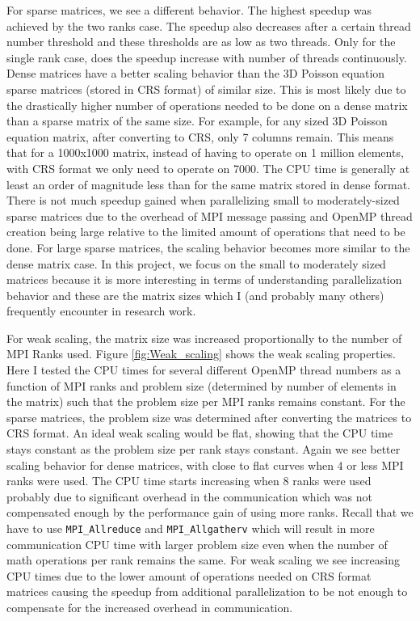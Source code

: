 \documentclass{article}
\begin{document}
For sparse matrices, we see a different behavior. The highest speedup was achieved by the two ranks case. The speedup also decreases after a certain thread number threshold and these thresholds are as low as two threads. Only for the single rank case, does the speedup increase with number of threads continuously. Dense matrices have a better scaling behavior than the 3D Poisson equation sparse matrices (stored in CRS format) of similar size. This is most likely due to the drastically higher number of operations needed to be done on a dense matrix than a sparse matrix of the same size. For example, for any sized 3D Poisson equation matrix, after converting to CRS, only 7 columns remain. This means that for a 1000x1000 matrix, instead of having to operate on 1 million elements, with CRS format we only need to operate on 7000. The CPU time is generally at least an order of magnitude less than for the same matrix stored in dense format. There is not much speedup gained when parallelizing small to moderately-sized sparse matrices due to the overhead of MPI message passing and OpenMP thread creation being large relative to the limited amount of operations that need to be done. For large sparse matrices, the scaling behavior becomes more similar to the dense matrix case. In this project, we focus on the small to moderately sized matrices because it is more interesting in terms of understanding parallelization behavior and these are the matrix sizes which I (and probably many others) frequently encounter in research work.

For weak scaling, the matrix size was increased proportionally to the number of MPI Ranks used. Figure \ref{fig:Weak_scaling} shows the weak scaling properties. Here I tested the CPU times for several different OpenMP thread numbers as a function of MPI ranks and problem size (determined by number of elements in the matrix) such that the problem size per MPI ranks remains constant. For the sparse matrices, the problem size was determined after converting the matrices to CRS format. An ideal weak scaling would be flat, showing that the CPU time stays constant as the problem size per rank stays constant. Again we see better scaling behavior for dense matrices, with close to flat curves when 4 or less MPI ranks were used. The CPU time starts increasing when 8 ranks were used probably due to significant overhead in the communication which was not compensated enough by the performance gain of using more ranks. Recall that we have to use \texttt{MPI\_Allreduce} and \texttt{MPI\_Allgatherv} which will result in more communication CPU time with larger problem size even when the number of math operations per rank remains the same. For weak scaling we see increasing CPU times due to the lower amount of operations needed on CRS format matrices causing the speedup from additional parallelization to be not enough to compensate for the increased overhead in communication.
\end{document}
